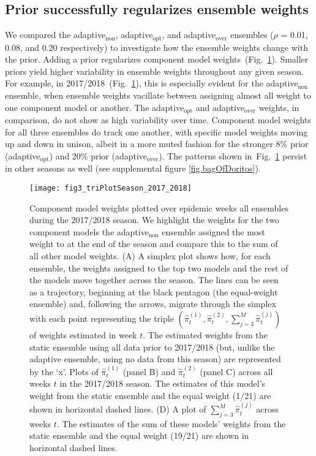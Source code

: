 \documentclass[12pt]{article}
\begin{document}
\subsection{Prior successfully regularizes ensemble weights} 

We compared the adaptive$_{\text{non}}$, adaptive$_{\text{opt}}$, and adaptive$_{\text{over}}$ ensembles ($\rho$ = 0.01, 0.08, and 0.20 respectively) to investigate how the ensemble weights change with the prior.
Adding a prior regularizes component model weights~(Fig.~\ref{fig3.dorito}).
Smaller priors yield higher variability in ensemble weights throughout any given season. 
For example, in 2017/2018~(Fig.~\ref{fig3.dorito}), this is especially evident for the adaptive$_{\text{non}}$ ensemble, when ensemble weights vacillate between assigning almost all weight to one component model or another.
The adaptive$_{\text{opt}}$ and adaptive$_{\text{over}}$ weights, in comparison, do not show as high variability over time.
Component model weights for all three ensembles do track one another, with specific model weights moving up and down in unison, albeit in a more muted fashion for the stronger 8\% prior (adaptive$_{\text{opt}}$) and 20\% prior (adaptive$_{\text{over}}$).
The patterns shown in~Fig.~\ref{fig3.dorito} persist in other seasons as well (see supplemental figure \ref{fig.bagOfDoritos}).

\graphicspath{{../_6_TLGs/_G/fig3_triPlot/}}
\begin{figure}[ht!]
    \centering
    \texttt{[image: fig3\_triPlotSeason\_2017\_2018]}
    \caption{
    Component model weights plotted over epidemic weeks all ensembles during the 2017/2018 season. 
    We highlight the weights for the two component models the adaptive$_{\text{non}}$ ensemble assigned the most weight to at the end of the season and compare this to the sum of all other model weights. 
    (A) A simplex plot shows how, for each
    ensemble, the weights assigned to the top two models and the rest of the models move together across the season. 
    The lines can be seen as a trajectory, beginning at the black pentagon (the equal-weight ensemble) and, following the arrows, migrate through the simplex with each point representing the triple $(\hat\pi_t^{(1)}, \hat\pi_t^{(2)}, \sum_{j=3}^M\hat\pi_t^{(j)})$ of weights estimated in week $t$. The estimated weights from the static ensemble using all data prior to 2017/2018 (but, unlike the adaptive ensemble, using no data from this season) are represented by the `x'.
    Plots of $\hat\pi_t^{(1)}$ (panel B) and $\hat\pi_t^{(2)}$ (panel C) across all weeks $t$ in the 2017/2018 season. The estimates of this model's weight from the static ensemble and the equal weight (1/21) are shown in horizontal dashed lines.
    (D) A plot of $\sum_{j=3}^M\hat\pi_t^{(j)}$ across weeks $t$. The estimates of the sum of these models' weights from the static ensemble and the equal weight (19/21) are shown in horizontal dashed lines.
     \label{fig3.dorito}}
\end{figure}
\end{document}
